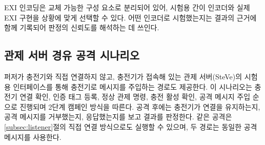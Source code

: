 EXI 인코딩은 교체 가능한 구성 요소로 분리되어 있어, 시험용 간이 인코더와 실제 EXI 구현을 상황에 맞게 선택할 수 있다.
어떤 인코더로 시험했는지는 결과의 근거에 함께 기록되어 판정의 신뢰도를 해석하는 데 쓰인다.

\subsection{관제 서버 경유 공격 시나리오}

퍼저가 충전기와 직접 연결하지 않고, 충전기가 접속해 있는 관제 서버(SteVe)의 시험용 인터페이스를 통해 충전기로 메시지를 주입하는 경로도 제공한다.
이 시나리오는 충전기 연결 확인, 인증 태그 등록, 정상 관제 명령, 충전 활성 확인, 공격 메시지 주입 순으로 진행되며 2단계 캠페인 방식을 따른다.
공격 후에는 충전기가 연결을 유지하는지, 공격 메시지를 거부했는지, 응답했는지를 보고 결과를 판정한다.
같은 공격은 \ref{subsec:listener}절의 직접 연결 방식으로도 실행할 수 있으며, 두 경로는 동일한 공격 메시지를 사용한다.

